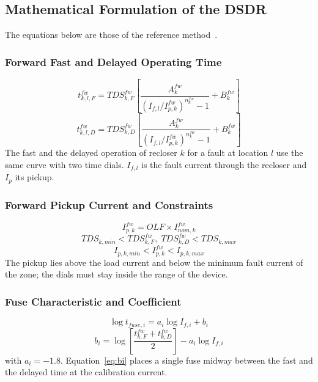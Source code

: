 \documentclass[12pt,a4paper]{article}
\begin{document}
\subsection{Mathematical Formulation of the DSDR}
\label{sec:dsdr}
The equations below are those of the reference method~\cite{yousaf2022}.

\subsubsection{Forward Fast and Delayed Operating Time}
\begin{equation}
t^{fw}_{k,l,F} = TDS^{fw}_{k,F}\left[\frac{A^{fw}_{k}}{\left(I_{f,l}/I^{fw}_{p,k}\right)^{n^{fw}_{k}}-1}+B^{fw}_{k}\right]
\label{eq:tf}
\end{equation}
\begin{equation}
t^{fw}_{k,l,D} = TDS^{fw}_{k,D}\left[\frac{A^{fw}_{k}}{\left(I_{f,l}/I^{fw}_{p,k}\right)^{n^{fw}_{k}}-1}+B^{fw}_{k}\right]
\label{eq:td}
\end{equation}
The fast and the delayed operation of recloser $k$ for a fault at location $l$ use the same curve with two
time dials. $I_{f,l}$ is the fault current through the recloser and $I_p$ its pickup.

\subsubsection{Forward Pickup Current and Constraints}
\begin{equation}
I^{fw}_{p,k} = OLF \times I^{fw}_{nom,k}
\label{eq:ipfw}
\end{equation}
\begin{equation}
TDS_{k,min} < TDS^{fw}_{k,F},\; TDS^{fw}_{k,D} < TDS_{k,max}
\label{eq:tdslim}
\end{equation}
\begin{equation}
I_{p,k,min} < I^{fw}_{p,k} < I_{p,k,max}
\label{eq:iplim}
\end{equation}
The pickup lies above the load current and below the minimum fault current of the zone; the dials must stay
inside the range of the device.

\subsubsection{Fuse Characteristic and Coefficient}
\begin{equation}
\log t_{fuse,i} = a_i \log I_{f,i} + b_i
\label{eq:fuse}
\end{equation}
\begin{equation}
b_i = \log\!\left[\frac{t^{fw}_{k,F}+t^{fw}_{k,D}}{2}\right] - a_i \log I_{f,i}
\label{eq:bi}
\end{equation}
with $a_i=-1.8$. Equation~\eqref{eq:bi} places a single fuse midway between the fast and the delayed time at
the calibration current.
\end{document}

